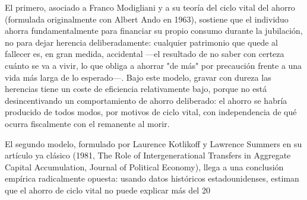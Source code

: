 \documentclass[10pt,a4paper]{article}
\begin{document}
El primero, asociado a Franco Modigliani y a su teoría del ciclo vital del ahorro (formulada originalmente con Albert Ando en 1963), sostiene que el individuo ahorra fundamentalmente para financiar su propio consumo durante la jubilación, no para dejar herencia deliberadamente: cualquier patrimonio que quede al fallecer es, en gran medida, accidental —el resultado de no saber con certeza cuánto se va a vivir, lo que obliga a ahorrar "de más" por precaución frente a una vida más larga de lo esperado—. Bajo este modelo, gravar con dureza las herencias tiene un coste de eficiencia relativamente bajo, porque no está desincentivando un comportamiento de ahorro deliberado: el ahorro se habría producido de todos modos, por motivos de ciclo vital, con independencia de qué ocurra fiscalmente con el remanente al morir.

El segundo modelo, formulado por Laurence Kotlikoff y Lawrence Summers en su artículo ya clásico (1981, The Role of Intergenerational Transfers in Aggregate Capital Accumulation, Journal of Political Economy), llega a una conclusión empírica radicalmente opuesta: usando datos históricos estadounidenses, estiman que el ahorro de ciclo vital no puede explicar más del 20%
\end{document}
